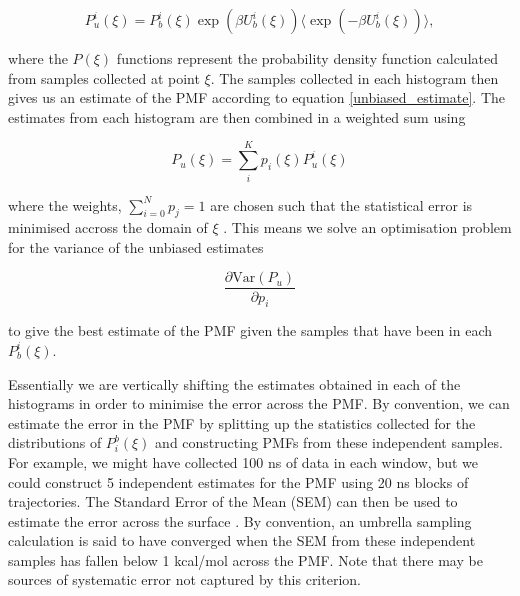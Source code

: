 \begin{equation}
	P_u^i(\xi) = P_b^i(\xi) \exp(\beta U_{b}^i (\xi)) \langle \exp(-\beta U_b^i (\xi))\rangle,
\end{equation}

where the $P(\xi)$  functions represent the probability density function calculated from samples collected at point $\xi$. The samples collected in each histogram then gives us an estimate of the PMF according to equation \ref{unbiased_estimate}. The estimates from each histogram are then combined in a weighted sum using

\begin{equation}
	P_u(\xi) = \sum_i^K p_i(\xi)P_u^i (\xi)
\end{equation}

where the weights, $\sum_{i=0}^N p_j = 1$ are chosen such that the statistical error is minimised accross the domain of $\xi$ \cite{chen2011}. This means we solve an optimisation problem for the variance of the unbiased estimates

\begin{equation}
	\frac{\partial\text{Var} (P_u)}{\partial p_i}
\end{equation}

to give the best estimate of the PMF given the samples that have been in each $P_b^i(\xi)$. 

Essentially we are vertically shifting the estimates obtained in each of the histograms in order to minimise the error across the PMF. By convention, we can estimate the error in the PMF by splitting up the statistics collected for the distributions of $P^b_i (\xi)$ and constructing PMFs from these independent samples. For example, we might have collected 100 ns of data in each window, but we could construct 5 independent estimates for the PMF using 20 ns blocks of trajectories. The Standard Error of the Mean (SEM) can then be used to estimate the error across the surface \cite{gapsys2020}. By convention, an umbrella sampling calculation is said to have converged when the SEM from these independent samples has fallen below 1 kcal/mol across the PMF. Note that there may be sources of systematic error not captured by this criterion. 

